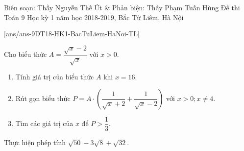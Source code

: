 
\begin{name}
{Biên soạn: Thầy Nguyễn Thế Út \& Phản biện: Thầy Phạm Tuấn Hùng}
{Đề thi Toán 9 Học kỳ 1 năm học 2018-2019, Bắc Từ Liêm, Hà Nội }
\end{name}
\setcounter{bt}{0}
[ans/ans-9DT18-HK1-BacTuLiem-HaNoi-TL]
\begin{bt}%
	Cho biểu thức $ A=\dfrac{\sqrt{x}-2}{\sqrt{x}} $ với $ x>0 $.
	\begin{enumerate}
		\item Tính giá trị của biểu thức $ A $ khi $ x=16 $.
		\item Rút gọn biểu thức $ P=A\cdot\left(\dfrac{1}{\sqrt{x}+2}+\dfrac{1}{\sqrt{x}-2}\right) $ với $ x>0;x\neq 4 $.
		\item Tìm các giá trị của $ x $ để $ P>\dfrac{1}{3} $.
	\end{enumerate}
\end{bt}
\begin{bt}%
	Thực hiện phép tính $ \sqrt{50}-3\sqrt{8}+\sqrt{32} $.
	
\end{bt}
